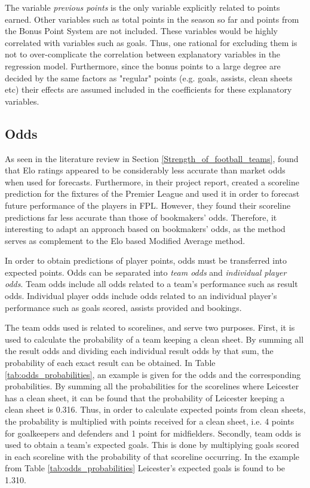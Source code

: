 \newpar 

The variable \textit{previous points} is the only variable explicitly related to points earned. Other variables such as total points in the season so far and points from the Bonus Point System are not included. These variables would be highly correlated with variables such as goals. Thus, one rational for excluding them is not to over-complicate the correlation between explanatory variables in the regression model. Furthermore, since the bonus points to a large degree are decided by the same factors as "regular" points (e.g. goals, assists, clean sheets etc) their effects are assumed included in the coefficients for these explanatory variables. 


\subsection{Odds}

As seen in the literature review in Section \ref{Strength_of_football_teams}, \cite{Hvattum} found that Elo ratings appeared to be considerably less accurate than market odds when used for forecasts. Furthermore, in their project report, \cite{Gupta} created a scoreline prediction for the fixtures of the Premier League and used it in order to forecast future performance of the players in FPL. However, they found their scoreline predictions far less accurate than those of bookmakers' odds. Therefore, it interesting to adapt an approach based on bookmakers' odds, as the method serves as complement to the Elo based Modified Average method.


\newpar

In order to obtain predictions of player points, odds must be transferred into expected points. Odds can be separated into \textit{team odds} and \textit{individual player odds}. Team odds include all odds related to a team's performance such as result odds. Individual player odds include odds related to an individual player's performance such as goals scored, assists provided and bookings. 

\newpar

The team odds used is related to scorelines, and serve two purposes. First, it is used to calculate the probability of a team keeping a clean sheet. By summing all the result odds and dividing each individual result odds by that sum, the probability of each exact result can be obtained. In Table \ref{tab:odds_probabilities}, an example is given for the odds and the corresponding probabilities. By summing all the probabilities for the scorelines where Leicester has a clean sheet, it can be found that the probability of Leicester keeping a clean sheet is 0.316. Thus, in order to calculate expected points from clean sheets, the probability is multiplied with points received for a clean sheet, i.e. 4 points for goalkeepers and defenders and 1 point for midfielders. Secondly, team odds is used to obtain a team's expected goals. This is done by multiplying goals scored in each scoreline with the probability of that scoreline occurring. In the example from Table \ref{tab:odds_probabilities} Leicester's expected goals is found to be 1.310.


